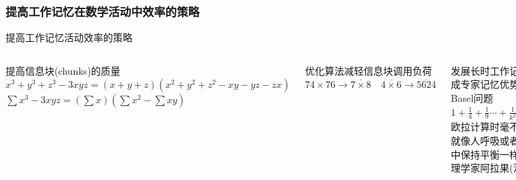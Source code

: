 \documentclass[serif]{beamer}
\begin{document}
    \subsubsection{提高工作记忆在数学活动中效率的策略}
       \begin{frame}{提高工作记忆活动效率的策略}
          \begin{columns}
          	  \begin{block}{提高信息块(chunks)的质量}
          	  	$ x^3+y^3+z^3-3xyz=(x+y+z)(x^2+y^2+z^2-xy-yz-zx) $\\
          	  	$ \sum x^3-3xyz=(\sum x)(\sum x^2-\sum xy) $
          	  \end{block}
              \pause
              \begin{block}{优化算法减轻信息块调用负荷}
              	$ 74\times 76\longrightarrow\overline{7\times 8} \quad\overline{4\times6}\longrightarrow\overline{5624} $
              \end{block}
              \pause
              \begin{block}{发展长时工作记忆，形成专家记忆优势效应}
              	Basel问题$ 1+\frac{1}{4}+\frac{1}{9} \cdots +\frac{1}{k^2} +\cdots=\frac{\pi^2}{6} $\\
              	欧拉计算时毫不费力，就像人呼吸或者鹰在风中保持平衡一样——物理学家阿拉果(法)
              \end{block}
          	\pause
          	\includegraphics[scale=0.6]{EULER1.jpg}
          \end{columns}
       \end{frame}
   
\end{document}
